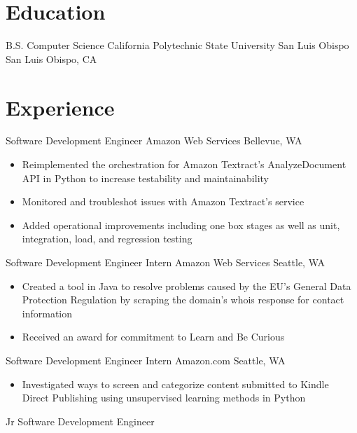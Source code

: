 \documentclass[11pt,a4paper,sans,final]{moderncv}
\begin{document}
\makecvtitle
\begin{FlushLeft}
    \section{Education}
        {B.S. Computer Science}
        {California Polytechnic State University San Luis Obispo}
        {San Luis Obispo, CA}
        {}
        {}

    \section{Experience}
        {Software Development Engineer}
        {Amazon Web Services}
        {Bellevue, WA}
        {}
        {
            \begin{itemize}
                \item Reimplemented the orchestration for Amazon Textract's AnalyzeDocument API in Python to increase testability and maintainability
                \item Monitored and troubleshot issues with Amazon Textract's service
                \item Added operational improvements including one box stages as well as unit, integration, load, and regression testing
            \end{itemize}
        }
        {Software Development Engineer Intern}
        {Amazon Web Services}
        {Seattle, WA}
        {}
        {
            \begin{itemize}
                \item Created a tool in Java to resolve problems caused by the EU's General Data Protection Regulation by scraping the domain's whois response for contact information
                \item Received an award for commitment to Learn and Be Curious
            \end{itemize}
        }
        {Software Development Engineer Intern}
        {Amazon.com}
        {Seattle, WA}
        {}
        {
            \begin{itemize}
                \item Investigated ways to screen and categorize content submitted to Kindle Direct Publishing using unsupervised learning methods in Python
            \end{itemize}
        }
        {Jr Software Development Engineer}

\end{FlushLeft}
\end{document}
